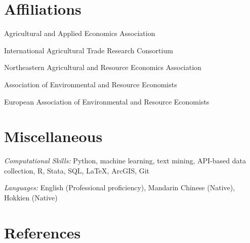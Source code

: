 \documentclass[10.5pt,letterpaper]{article}
\renewenvironment{itemize}{
	\begin{list}{}{
			\setlength{\leftmargin}{1.5em}
		}
	}{
	\end{list}
}
\begin{document}
	
	\section*{\textbf{Affiliations}}
	\begin{itemize}
		\item[-] Agricultural and Applied Economics Association
		\item[-] International Agricultural Trade Research Consortium
		\item[-] Northeastern Agricultural and Resource Economics Association
		\item[-] Association of Environmental and Resource Economists
		\item[-] European Association of Environmental and Resource Economists
	\end{itemize}
	
	\section*{\textbf{Miscellaneous}}
	\begin{itemize}
		
		\item[-] \textit{Computational Skills:} Python, machine learning, text mining, API-based data collection, R, Stata, SQL, \LaTeX, ArcGIS, Git
		
		\item[-] \textit{Languages:} English (Professional proficiency), Mandarin Chinese (Native), Hokkien (Native)
		
	\end{itemize}
	
	\newpage
	\section*{\textbf{References}}
	
\end{document}
